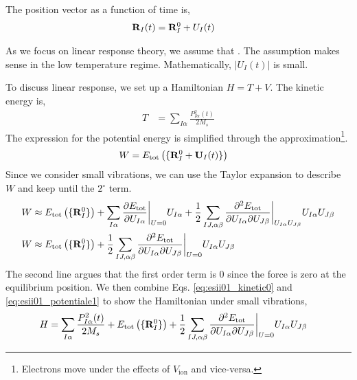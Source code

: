 The position vector as a function of time is,
\begin{align}
    \mathbf{R}_I(t) &= \mathbf{R}_I^0 + U_I(t) \label{eq:esii01_position_v_t}
\end{align}

As we focus on linear response theory, we assume that . The assumption makes sense in the low temperature regime. Mathematically, $|U_I(t)|$ is small.

To discuss linear response, we set up a Hamiltonian $H=T+V$. The kinetic energy is,
\begin{align}
    T&= \sum_{I\alpha} \frac{P_{I\alpha}^2(t)}{2M_s} \label{eq:esii01_kinetic0}
\end{align}
The expression for the potential energy is simplified through the  approximation\footnote{Electrons move under the effects of $V_\text{ion}$ and vice-versa.}. 
\begin{align}
    W &= E_\text{tot}\left(\lbrace \mathbf{R}_I^0 + \mathbf{U}_I(t)\rbrace\right)
    \label{eq:esii01_potentiale0}
\end{align}
Since we consider small vibrations, we can use the Taylor expansion to describe $W$ and keep until the $2^\circ$ term.
\begin{align}
    W &\approx E_\text{tot}\left(\lbrace \mathbf{R}_I^0\rbrace\right) + \sum_{I\alpha} \frac{\partial E_\text{tot}}{\partial U_{I\alpha}}\biggr\rvert_{U=0}U_{I\alpha} + \frac{1}{2} \sum_{IJ,\alpha\beta} \frac{\partial^2 E_\text{tot}}{\partial U_{I\alpha}\partial U_{J\beta}}\biggr\rvert_{U_{I\alpha}U_{J\beta}}U_{I\alpha}U_{J\beta} \notag\\
    W &\approx E_\text{tot}\left(\lbrace \mathbf{R}_I^0\rbrace\right) + \frac{1}{2} \sum_{IJ,\alpha\beta} \frac{\partial^2 E_\text{tot}}{\partial U_{I\alpha}\partial U_{J\beta}}\biggr\rvert_{U=0}U_{I\alpha}U_{J\beta} \label{eq:esii01_potentiale1}
\end{align}
The second line argues that the first order term is $0$ since the force is zero at the equilibrium position. We then combine Eqs. \ref{eq:esii01_kinetic0} and \ref{eq:esii01_potentiale1} to show the Hamiltonian under small vibrations,
\begin{align}
    H &= \sum_{I\alpha} \frac{P_{I\alpha}^2(t)}{2M_s} + E_\text{tot}\left(\lbrace \mathbf{R}_I^0\rbrace\right) + \frac{1}{2} \sum_{IJ,\alpha\beta} \frac{\partial^2 E_\text{tot}}{\partial U_{I\alpha}\partial U_{J\beta}}\biggr\rvert_{U=0}U_{I\alpha}U_{J\beta}
\end{align}

